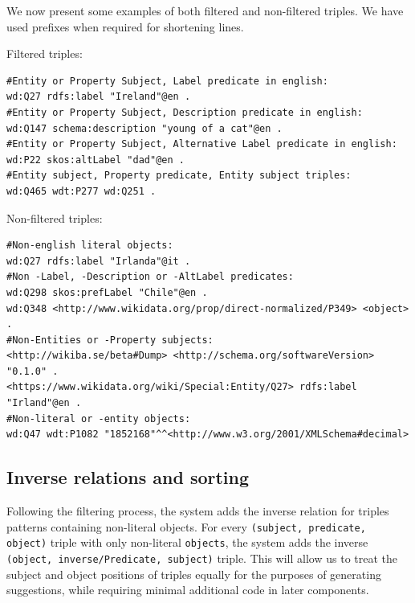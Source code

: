 \begin{example}
We now present some examples of both filtered and non-filtered triples.
We have used prefixes when required for shortening lines.

Filtered triples:
\begin{verbatim}
#Entity or Property Subject, Label predicate in english:
wd:Q27 rdfs:label "Ireland"@en .
#Entity or Property Subject, Description predicate in english:
wd:Q147 schema:description "young of a cat"@en .
#Entity or Property Subject, Alternative Label predicate in english:
wd:P22 skos:altLabel "dad"@en .
#Entity subject, Property predicate, Entity subject triples:
wd:Q465 wdt:P277 wd:Q251 .
\end{verbatim}

Non-filtered triples:
\begin{verbatim}
#Non-english literal objects:
wd:Q27 rdfs:label "Irlanda"@it .
#Non -Label, -Description or -AltLabel predicates:
wd:Q298 skos:prefLabel "Chile"@en .
wd:Q348 <http://www.wikidata.org/prop/direct-normalized/P349> <object> .
#Non-Entities or -Property subjects:
<http://wikiba.se/beta#Dump> <http://schema.org/softwareVersion> "0.1.0" .
<https://www.wikidata.org/wiki/Special:Entity/Q27> rdfs:label "Irland"@en .
#Non-literal or -entity objects:
wd:Q47 wdt:P1082 "1852168"^^<http://www.w3.org/2001/XMLSchema#decimal>
\end{verbatim}
\end{example}

\subsection{Inverse relations and sorting}

Following the filtering process, the system adds the inverse relation for triples patterns containing non-literal objects. 
For every \texttt{(subject, predicate, object)} triple with only non-literal \texttt{objects}, the system adds the inverse \texttt{(object, inverse/Predicate, subject)} triple. This will allow us to treat the subject and object positions of triples equally for the purposes of generating suggestions, while requiring minimal additional code in later components.

